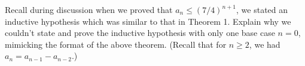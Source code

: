 Recall during discussion when we proved that $a_n \leq (7/4)^{n + 1}$, we stated an inductive hypothesis which was similar to that in Theorem 1. Explain why we couldn't state and prove the inductive hypothesis with only one base case $n = 0$, mimicking the format of the above theorem. (Recall that for $n \geq 2$, we had $a_n = a_{n-1} - a_{n-2}$.) 